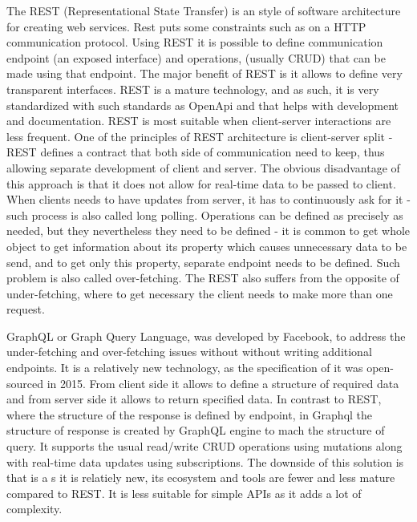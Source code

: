 The REST (Representational State Transfer) is an style of software architecture for creating web services. Rest puts some constraints such as  on a HTTP communication protocol. Using REST it is possible to define communication endpoint (an exposed interface) and operations, (usually CRUD) that can be made using that endpoint. The major benefit of REST is it allows to define very transparent interfaces. REST is a mature technology, and as such, it is very standardized with such standards as OpenApi and that helps with development and documentation. REST is most suitable when client-server interactions are less frequent. One of the principles of REST architecture is client-server split - REST defines a contract that both side of communication need to keep, thus allowing separate development of client and server. The obvious disadvantage of this approach is that it does not allow for real-time data to be passed to client. When clients needs to have updates from server, it has to continuously ask for it - such process is also called long polling. Operations can be defined as precisely as needed, but they nevertheless they need to be defined - it is common to get whole object to get information about its property which causes unnecessary data to be send, and to get only this property, separate endpoint needs to be defined. Such problem is also called over-fetching. The REST also suffers from the opposite of under-fetching, where to get necessary the client needs to make more than one request.

GraphQL or Graph Query Language, was developed by Facebook, to address the under-fetching and over-fetching issues without without writing additional endpoints.  It is a relatively new technology, as the specification of it was open-sourced in 2015. From client side it allows to define a structure of required data and from server side it allows to return specified data. In contrast to REST, where the structure of the response is defined by endpoint, in Graphql the structure of response is created by GraphQL engine to mach the structure of query. It supports the usual read/write CRUD operations using mutations along with real-time data updates using subscriptions. The downside of this solution is that is a s it is relatiely new, its ecosystem and tools are fewer and less mature compared to REST. It is less suitable for simple APIs as it adds a lot of complexity.

